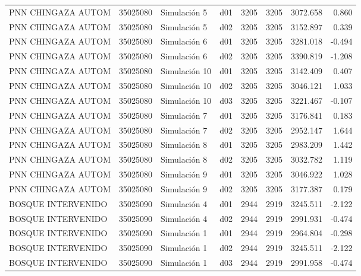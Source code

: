 \begin{landscape}
\begin{longtable}{lrlp{2cm}p{2cm}p{3cm}p{2cm}r}
      PNN CHINGAZA AUTOM &  35025080 &   Simulación 5 &   d01 &      3205 &     3205 &  3072.658 &     0.860 \\
      PNN CHINGAZA AUTOM &  35025080 &   Simulación 5 &   d02 &      3205 &     3205 &  3152.897 &     0.339 \\
      PNN CHINGAZA AUTOM &  35025080 &   Simulación 6 &   d01 &      3205 &     3205 &  3281.018 &    -0.494 \\
      PNN CHINGAZA AUTOM &  35025080 &   Simulación 6 &   d02 &      3205 &     3205 &  3390.819 &    -1.208 \\
      PNN CHINGAZA AUTOM &  35025080 &  Simulación 10 &   d01 &      3205 &     3205 &  3142.409 &     0.407 \\
      PNN CHINGAZA AUTOM &  35025080 &  Simulación 10 &   d02 &      3205 &     3205 &  3046.121 &     1.033 \\
      PNN CHINGAZA AUTOM &  35025080 &  Simulación 10 &   d03 &      3205 &     3205 &  3221.467 &    -0.107 \\
      PNN CHINGAZA AUTOM &  35025080 &   Simulación 7 &   d01 &      3205 &     3205 &  3176.841 &     0.183 \\
      PNN CHINGAZA AUTOM &  35025080 &   Simulación 7 &   d02 &      3205 &     3205 &  2952.147 &     1.644 \\
      PNN CHINGAZA AUTOM &  35025080 &   Simulación 8 &   d01 &      3205 &     3205 &  2983.209 &     1.442 \\
      PNN CHINGAZA AUTOM &  35025080 &   Simulación 8 &   d02 &      3205 &     3205 &  3032.782 &     1.119 \\
      PNN CHINGAZA AUTOM &  35025080 &   Simulación 9 &   d01 &      3205 &     3205 &  3046.922 &     1.028 \\
      PNN CHINGAZA AUTOM &  35025080 &   Simulación 9 &   d02 &      3205 &     3205 &  3177.387 &     0.179 \\
      BOSQUE INTERVENIDO &  35025090 &   Simulación 4 &   d01 &      2944 &     2919 &  3245.511 &    -2.122 \\
      BOSQUE INTERVENIDO &  35025090 &   Simulación 4 &   d02 &      2944 &     2919 &  2991.931 &    -0.474 \\
      BOSQUE INTERVENIDO &  35025090 &   Simulación 1 &   d01 &      2944 &     2919 &  2964.804 &    -0.298 \\
      BOSQUE INTERVENIDO &  35025090 &   Simulación 1 &   d02 &      2944 &     2919 &  3245.511 &    -2.122 \\
      BOSQUE INTERVENIDO &  35025090 &   Simulación 1 &   d03 &      2944 &     2919 &  2991.958 &    -0.474 \\

\end{longtable}
\end{landscape}
